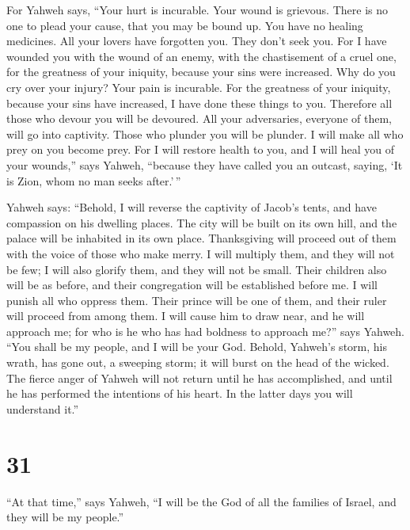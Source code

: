  For Yahweh says, ``Your hurt is incurable. Your wound is
grievous.  There is no one to plead your cause, that you
may be bound up. You have no healing medicines.  All your
lovers have forgotten you. They don't seek you. For I have wounded you
with the wound of an enemy, with the chastisement of a cruel one, for
the greatness of your iniquity, because your sins were increased.
 Why do you cry over your injury? Your pain is incurable.
For the greatness of your iniquity, because your sins have increased, I
have done these things to you.  Therefore all those who
devour you will be devoured. All your adversaries, everyone of them,
will go into captivity. Those who plunder you will be plunder. I will
make all who prey on you become prey.  For I will restore
health to you, and I will heal you of your wounds,'' says Yahweh,
``because they have called you an outcast, saying, `It is Zion, whom no
man seeks after.'\,''

 Yahweh says: ``Behold, I will reverse the captivity of
Jacob's tents, and have compassion on his dwelling places. The city will
be built on its own hill, and the palace will be inhabited in its own
place.  Thanksgiving will proceed out of them with the
voice of those who make merry. I will multiply them, and they will not
be few; I will also glorify them, and they will not be small.
 Their children also will be as before, and their
congregation will be established before me. I will punish all who
oppress them.  Their prince will be one of them, and
their ruler will proceed from among them. I will cause him to draw near,
and he will approach me; for who is he who has had boldness to approach
me?'' says Yahweh.  ``You shall be my people, and I will
be your God.  Behold, Yahweh's storm, his wrath, has gone
out, a sweeping storm; it will burst on the head of the wicked.
 The fierce anger of Yahweh will not return until he has
accomplished, and until he has performed the intentions of his heart. In
the latter days you will understand it.''

\hypertarget{section-30}{%
\section{31}\label{section-30}}

 ``At that time,'' says Yahweh, ``I will be the God of all
the families of Israel, and they will be my people.''

